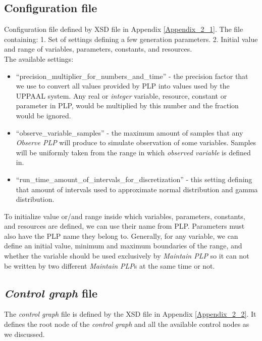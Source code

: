 \subsection{Configuration file }
Configuration file defined by XSD file in Appendix \ref{Appendix_2_1}. The file containing: 1. Set of settings defining a few generation parameters. 2. Initial value and range of variables, parameters, constants, and resources.\\
The available settings: 
\begin{itemize}
\item  “precision_multiplier_for_numbers_and_time” - the precision factor that we use to convert all values provided by PLP into values used by the UPPAAL system. Any real or \textit{integer} variable, resource, constant or parameter in PLP, would be multiplied by this number and the fraction would be ignored.
\item “observe_variable_samples” - the maximum amount of samples that any \textit{Observe PLP} will produce to simulate observation of some variables. Samples will be uniformly taken from the range in which \textit{observed variable} is defined in.
\item “run_time_amount_of_intervals_for_discretization” - this setting defining that amount of intervals used to approximate normal distribution and gamma distribution.
\end{itemize}
To initialize value or/and range inside which variables, parameters, constants, and resources are defined, we can use their name from PLP. Parameters must also have the PLP name they belong to. Generally, for any variable, we can define an initial value, minimum and maximum boundaries of the range, and whether the variable should be used exclusively by \textit{Maintain PLP} so it can not be written by two different \textit{Maintain PLP}s at the same time or not.\\
\subsection{\textit{Control graph} file }
The \textit{control graph} file is defined by the XSD file in Appendix \ref{Appendix_2_2}. It defines the root node of the \textit{control graph} and all the available control nodes as we discussed.\\

